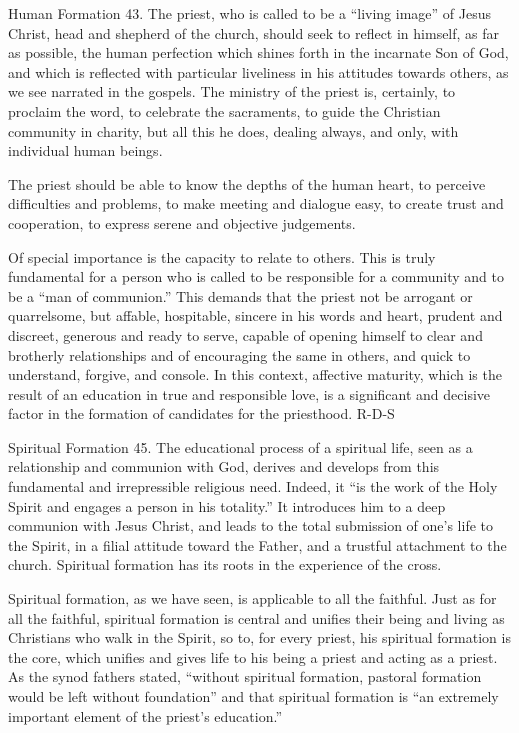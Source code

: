 \documentclass[oneside]{book}
\begin{document}
Human Formation
43. The priest, who is called to be a ``living image'' of Jesus Christ, head and
shepherd of the church, should seek to reflect in himself, as far as possible,
the human perfection which shines forth in the incarnate Son of God, and which
is reflected with particular liveliness in his attitudes towards others, as we
see narrated in the gospels. The ministry of the priest is, certainly, to
proclaim the word, to celebrate the sacraments, to guide the Christian community
in charity, but all this he does, dealing always, and only, with individual
human beings.

The priest should be able to know the depths of the human heart, to perceive
difficulties and problems, to make meeting and dialogue easy, to create trust
and cooperation, to express serene and objective judgements.

Of special importance is the capacity to relate to others. This is truly
fundamental for a person who is called to be responsible for a community and to
be a ``man of communion.'' This demands that the priest not be arrogant or
quarrelsome, but affable, hospitable, sincere in his words and heart, prudent
and discreet, generous and ready to serve, capable of opening himself to clear
and brotherly relationships and of encouraging the same in others, and quick to
understand, forgive, and console. In this context, affective maturity, which is
the result of an education in true and responsible love, is a significant and
decisive factor in the formation of candidates for the priesthood.
R-D-S

Spiritual Formation
45. The educational process of a spiritual life, seen as a relationship and
communion with God, derives and develops from this fundamental and irrepressible
religious need. Indeed, it ``is the work of the Holy Spirit and engages a person
in his totality.'' It introduces him to a deep communion with Jesus Christ, and
leads to the total submission of one's life to the Spirit, in a filial attitude
toward the Father, and a trustful attachment to the church. Spiritual formation
has its roots in the experience of the cross.

Spiritual formation, as we have seen, is applicable to all the faithful. Just as
for all the faithful, spiritual formation is central and unifies their being and
living as Christians who walk in the Spirit, so to, for every priest, his
spiritual formation is the core, which unifies and gives life to his being a
priest and acting as a priest. As the synod fathers stated, ``without spiritual
formation, pastoral formation would be left without foundation'' and that
spiritual formation is ``an extremely important element of the priest's
education.''
\end{document}
